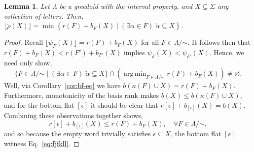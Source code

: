 \documentclass[11pt]{article}
\newtheorem{lemma}[theorem]{Lemma}
\newcommand{\univ}{\Sigma}
\newcommand{\glang}{\Lambda}
\newcommand{\greedyrep}{\ddot{\rho}}
\DeclareMathOperator*{\argmin}{arg\,min}
\begin{document}
\begin{lemma}\label{lem:opt-min-floor}
    Let $\glang$ be a greedoid with the interval property, and $X\subseteq \univ$ any collection of letters.
    Then, $\lfloor\greedyrep(X)\rfloor = \min\left\{r(F)+b_F(X)\mid (\exists \alpha \in F)\;\widetilde{\alpha}\subseteq X\right\}$.
\end{lemma}
\begin{proof}
    Recall $\lfloor\psi_F(X)\rfloor = r(F)+b_F(X)$ for all $F\in\glang/\mathord{\sim}$.
    It follows then that $r(F)+b_F(X) < r(F')+b_{F'}(X)$ implies $\psi_F(X) < \psi_{F'}(X)$.
    Hence, we need only show,
    \begin{equation}\label{eq:fjfkll}
        \{F\in\glang/\mathord{\sim}\mid(\exists\alpha\in F)\;\widetilde{\alpha}\subseteq X\}\cap\left(\argmin_{F\in\glang/\mathord{\sim}}r(F)+b_F(X)\right) \neq \varnothing.
    \end{equation}
    Well, via Corollary~\ref{cor:bf-eq} we have $b(\kappa(F)\cup X) = r(F) + b_F(X)$.
    Furthermore, monotonicity of the basis rank makes $b(X) \leq b(\kappa(F)\cup X)$, and for the bottom flat $[\epsilon]$ it should be clear that $r[\epsilon] + b_{[\epsilon]}(X) = b(X)$.
    Combining these observations together shows,
    \[
        r[\epsilon] + b_{[\epsilon]}(X) \leq r(F) + b_F(X),\quad\forall F\in\glang/\mathord{\sim},
    \]
    and so because the empty word trivially satisfies $\widetilde{\epsilon}\subseteq X$, the bottom flat $[\epsilon]$ witness Eq.~\ref{eq:fjfkll}.
\end{proof}
\end{document}
